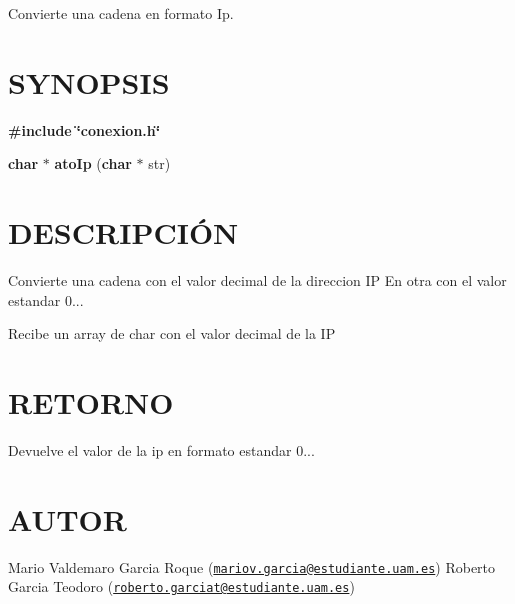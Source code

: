 Convierte una cadena en formato Ip.\hypertarget{cerrar_canal__s_s_l_SYNOPSIS}{}\section{S\-Y\-N\-O\-P\-S\-I\-S}\label{cerrar_canal__s_s_l_SYNOPSIS}
{\bfseries \#include} {\bfseries \char`\"{}conexion.\-h\char`\"{}} 

{\bfseries char} $\ast$ {\bfseries ato\-Ip} {\bfseries }({\bfseries char} $\ast$ str{\bfseries })\hypertarget{cerrar_canal__s_s_l_descripcion}{}\section{D\-E\-S\-C\-R\-I\-P\-C\-IÓ\-N}\label{cerrar_canal__s_s_l_descripcion}
Convierte una cadena con el valor decimal de la direccion I\-P En otra con el valor estandar 0...

Recibe un array de char con el valor decimal de la I\-P\hypertarget{cerrar_canal__s_s_l_retorno}{}\section{R\-E\-T\-O\-R\-N\-O}\label{cerrar_canal__s_s_l_retorno}
Devuelve el valor de la ip en formato estandar 0...\hypertarget{cerrar_canal__s_s_l_authors}{}\section{A\-U\-T\-O\-R}\label{cerrar_canal__s_s_l_authors}
Mario Valdemaro Garcia Roque (\href{mailto:mariov.garcia@estudiante.uam.es}{\tt mariov.\-garcia@estudiante.\-uam.\-es}) Roberto Garcia Teodoro (\href{mailto:roberto.garciat@estudiante.uam.es}{\tt roberto.\-garciat@estudiante.\-uam.\-es}) 